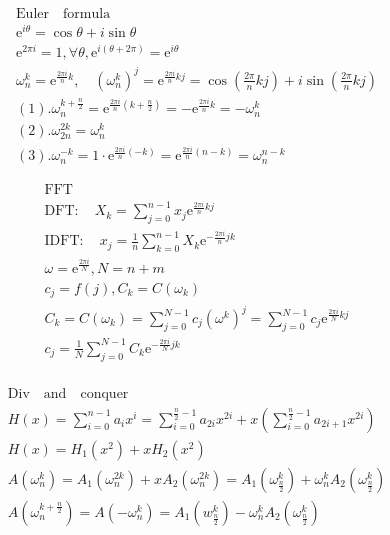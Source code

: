 \documentclass{article}
\begin{document}
\clearpage

\begin{align*}
    \mathrm{Euler \quad formula} \\
    \mathrm{e}^{i\theta} = \cos \theta + i\sin \theta\\
    \mathrm{e}^{2\pi i} = 1,\forall \theta, \mathrm{e}^{i(\theta+2\pi)} = \mathrm{e}^{i\theta}\\
    \omega_{n}^{k} = \mathrm{e}^{\frac{2\pi i}{n}k}, \quad (\omega_{n}^{k})^{j} = \mathrm{e}^{\frac{2\pi i}{n}kj} = \cos (\frac{2\pi }{n}kj) + i\sin (\frac{2\pi}{n}kj)\\
    (1). \omega_{n}^{k+\frac{n}{2}} = \mathrm{e}^{\frac{2\pi i}{n}(k+\frac{n}{2})} = -\mathrm{e}^{\frac{2\pi i}{n}k} = -\omega_{n}^{k}\\
    (2). \omega_{2n}^{2k} = \omega_{n}^{k} \\ 
    (3). \omega_{n}^{-k} = 1 \cdot \mathrm{e}^{\frac{2\pi i}{n}(-k)} = \mathrm{e}^{\frac{2\pi i}{n}(n-k)} = \omega_{n}^{n-k}
\end{align*}

\begin{align*}
    \mathrm{FFT} \\
    \mathrm{DFT} : \quad X_{k} = \sum_{j=0}^{n-1}x_{j}\mathrm{e}^{\frac{2\pi i}{n}kj}\\
    \mathrm{IDFT} : \quad x_{j} = \frac{1}{n}\sum_{k=0}^{n-1}X_{k}\mathrm{e}^{-\frac{2\pi i}{n}jk}\\
    \omega  = \mathrm{e}^{\frac{2 \pi i}{N}}, N = n+m\\
    c_{j} = f(j), C_{k} = C(\omega_{k})\\ 
    C_{k} = C(\omega_{k}) = \sum_{j=0}^{N-1}c_{j}(\omega^{k})^{j} = \sum_{j=0}^{N-1}c_{j}\mathrm{e}^{\frac{2\pi i}{N}kj}\\
    c_{j} = \frac{1}{N}\sum_{j=0}^{N-1}C_{k}\mathrm{e}^{-\frac{2\pi i}{N}jk}\\
\end{align*}

\begin{align*}
    \mathrm{Div \quad and \quad conquer} \\
    H(x) = \sum_{i=0}^{n-1}a_{i}x^{i} = \sum_{i=0}^{\frac{n}{2}-1}a_{2i}x^{2i} + x\left(\sum_{i=0}^{\frac{n}{2}-1}a_{2i+1}x^{2i}\right)\\
    H(x) = H_{1}(x^2)+xH_{2}(x^2)\\
    A(\omega_{n}^{k}) = A_{1}(\omega_{n}^{2k}) + xA_{2}(\omega_{n}^{2k}) = A_{1}(\omega_{\frac{n}{2}}^{k}) + \omega_{n}^{k} A_{2}(\omega_{\frac{n}{2}}^{k})\\
    A(\omega_{n}^{k+\frac{n}{2}}) = A(-\omega_{n}^{k}) = A_{1}(w_{\frac{n}{2}}^{k}) - \omega_{n}^{k} A_{2}(\omega_{\frac{n}{2}}^{k})\\
\end{align*}
\end{document}
